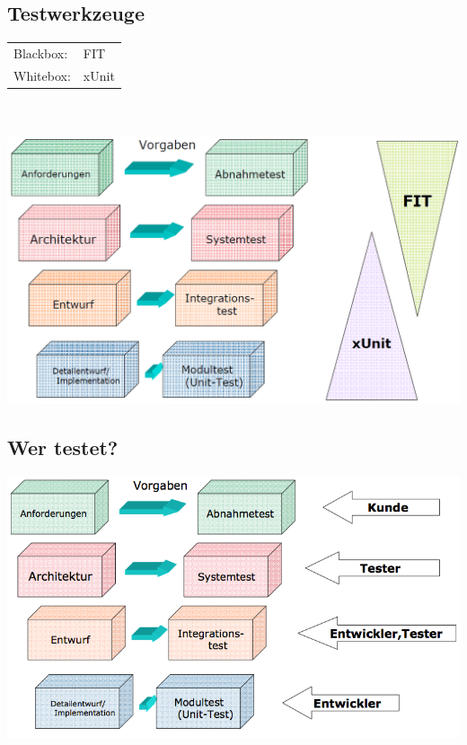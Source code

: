 \subsection{Testwerkzeuge}
\begin{minipage}{0.5\linewidth}
\begin{tabular}{ll}
	Blackbox: & FIT \\
	Whitebox: & xUnit
\end{tabular}
\\\\
	\includegraphics[width=\linewidth]{images/testwerkzeuge}
\end{minipage}
\begin{minipage}{0.5\linewidth}
	\subsection{Wer testet?}
	\includegraphics[width=\linewidth]{images/wer_testet}
\end{minipage}
\clearpage

